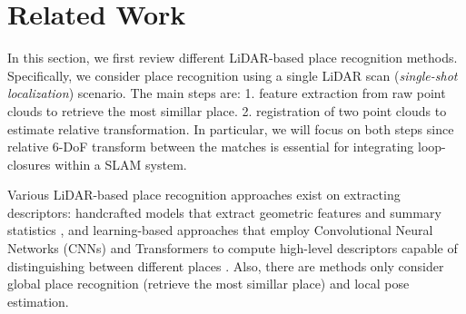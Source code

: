 \chapter{Related Work}
\label{sec:related}



In this section, we first review different LiDAR-based place recognition methods. Specifically, we consider place recognition using a single LiDAR scan (\emph{single-shot localization}) scenario. The main steps are: 1. feature extraction from raw point clouds to retrieve the most simillar place. 2. registration of two point clouds to estimate relative transformation. In particular, we will focus on both steps since relative 6-DoF transform between the matches is essential for integrating loop-closures within a SLAM system.  


Various LiDAR-based place recognition approaches exist on extracting descriptors: handcrafted models that extract geometric features and summary statistics \cite{kim2018iros, yuan2023icra}, and learning-based approaches that employ Convolutional Neural Networks (CNNs) and Transformers to compute high-level descriptors capable of distinguishing between different places \cite{vidanapathirana2022icra, komorowski2022ral}. Also, there are methods only consider global place recognition (retrieve the most simillar place) and local pose estimation.
 

